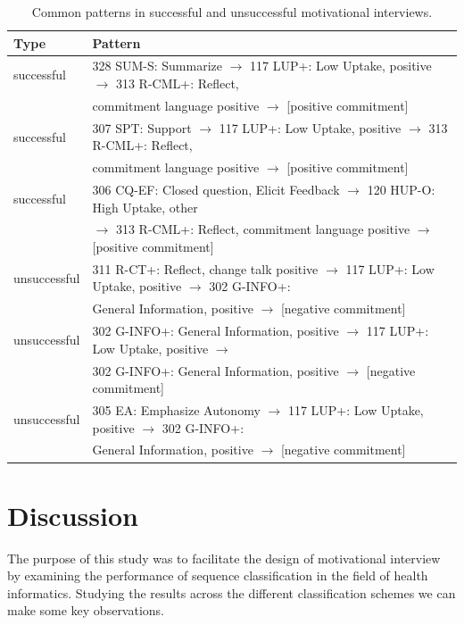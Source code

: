 \documentclass{amia}
\begin{document}
\begin{table}[h]
\centering
\caption{Common patterns in successful and unsuccessful motivational interviews.}
\label{tab:common_patterns}
  \begin{tabular}{|l|l|}
  \hline
   \textbf{Type} & \textbf{Pattern} \\ \hline      
successful & 328 SUM-S: Summarize $\rightarrow $ 117 LUP+: Low Uptake, positive $\rightarrow $ 313 R-CML+: Reflect, \\ 
& commitment language positive $\rightarrow $ [positive commitment] \\\hline
successful & 307 SPT: Support $\rightarrow $ 117 LUP+: Low Uptake, positive $\rightarrow $ 313 R-CML+: Reflect, \\
& commitment language positive $\rightarrow $ [positive commitment] \\\hline
successful & 306 CQ-EF: Closed question, Elicit Feedback $\rightarrow $ 120 HUP-O: High Uptake, other \\
& $\rightarrow $ 313 R-CML+: Reflect, commitment language positive $\rightarrow $ [positive commitment] \\\hline
unsuccessful & 311 R-CT+: Reflect, change talk positive $\rightarrow $ 117 LUP+: Low Uptake, positive $\rightarrow $ 302 G-INFO+:  \\
& General Information, positive $\rightarrow $ [negative commitment] \\\hline
unsuccessful & 302 G-INFO+: General Information, positive $\rightarrow $ 117 LUP+: Low Uptake, positive $\rightarrow $  \\
& 302 G-INFO+: General Information, positive $\rightarrow $ [negative commitment] \\\hline
unsuccessful & 305 EA: Emphasize Autonomy $\rightarrow $ 117 LUP+: Low Uptake, positive $\rightarrow $ 302 G-INFO+:  \\
& General Information, positive $\rightarrow $ [negative commitment] \\\hline
  \end{tabular}
\end{table} 

\section*{Discussion}
The purpose of this study was to facilitate the design of motivational interview by examining the performance of sequence classification in the field of health informatics. Studying the results across the different classification schemes we can make some key observations. 
\end{document}
